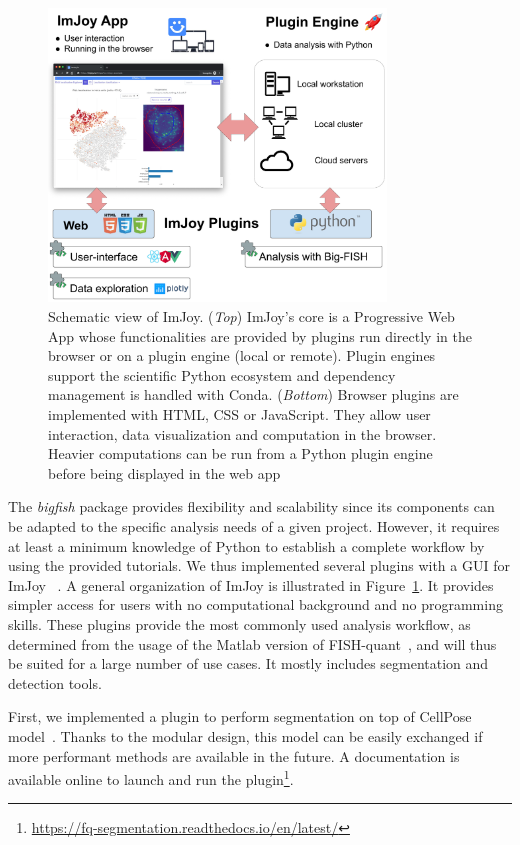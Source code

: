 \begin{figure}[h]
    \centering
    \includegraphics[width=0.8\textwidth]{figures/chapter1/schema_imjoy}
    \caption{Schematic view of ImJoy.
	(\textit{Top}) ImJoy's core is a Progressive Web App whose functionalities are provided by plugins run directly in the browser or on a plugin engine (local or remote).
	Plugin engines support the scientific Python ecosystem and dependency management is handled with Conda.
	(\textit{Bottom}) Browser plugins are implemented with HTML, CSS or JavaScript.
	They allow user interaction, data visualization and computation in the browser.
	Heavier computations can be run from a Python plugin engine before being displayed in the web app}
    \label{fig:imjoy}
\end{figure}

The \emph{bigfish} package provides flexibility and scalability since its components can be adapted to the specific analysis needs of a given project.
However, it requires at least a minimum knowledge of Python to establish a complete workflow by using the provided tutorials.
We thus implemented several plugins with a \ac{GUI} for ImJoy ~\cite{ouyang_imjoy_2019}.
A general organization of ImJoy is illustrated in Figure~\ref{fig:imjoy}.
It provides simpler access for users with no computational background and no programming skills.
These plugins provide the most commonly used analysis workflow, as determined from the usage of the Matlab version of FISH-quant~\cite{mueller_fish-quant_2013}, and will thus be suited for a large number of use cases.
It mostly includes segmentation and detection tools.

First, we implemented a plugin to perform segmentation on top of CellPose model~\cite{stringer_cellpose_2021}.
Thanks to the modular design, this model can be easily exchanged if more performant methods are available in the future.
A documentation is available online to launch and run the plugin\footnote{\url{https://fq-segmentation.readthedocs.io/en/latest/}}.


